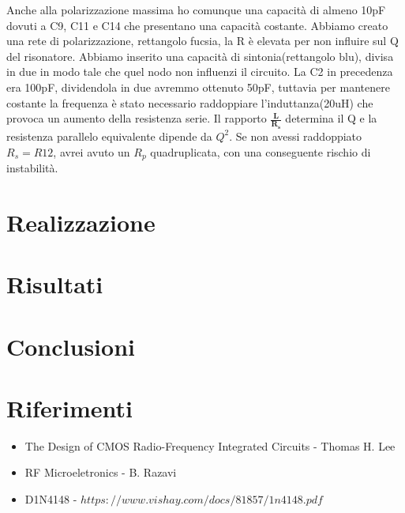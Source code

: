\documentclass{article}
\begin{document}
Anche alla polarizzazione massima ho comunque una capacità di almeno 10pF dovuti  a C9, C11 e C14 che presentano una capacità costante.
Abbiamo creato una rete di polarizzazione, rettangolo fucsia, la R è elevata per non influire sul Q del risonatore.
Abbiamo inserito una capacità di sintonia(rettangolo blu), divisa in due in modo tale che quel nodo non influenzi il circuito.
La C2 in precedenza era 100pF, dividendola in due avremmo ottenuto 50pF, tuttavia per mantenere costante la frequenza è stato necessario raddoppiare l'induttanza(20uH) che provoca un aumento della resistenza serie.
Il rapporto \LARGE$\bm{\frac{L}{R_s}}$ determina il Q e la resistenza parallelo equivalente dipende da $Q^2$.
Se non avessi raddoppiato $R_s=R12$, avrei avuto un $R_p$ quadruplicata, con una conseguente rischio di instabilità.

\newpage
\section{Realizzazione}

\newpage
\section{Risultati}

\newpage

\section{Conclusioni}

\newpage
\section{Riferimenti}

\begin{itemize}
\item The Design of CMOS Radio-Frequency Integrated Circuits - Thomas H. Lee
\item RF Microeletronics - B. Razavi
\item D1N4148 - $https://www.vishay.com/docs/81857/1n4148.pdf$
\end{itemize}
\end{document}
